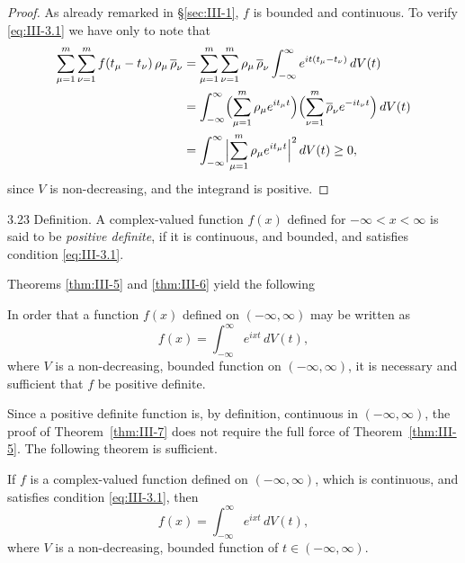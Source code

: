 \begin{proof}
As already remarked in \S\ref{sec:III-1}, $f$ is bounded and continuous. To verify \eqref{eq:III-3.1} we have only to note that
\begin{align*}
\sum_{\mu=1}^{m}\sum_{\nu=1}^{m}f(t_{\mu}-t_{\nu})\,\rho_{\mu}\,\overline{\rho}_{\nu}
&=\sum_{\mu=1}^{m}\sum_{\nu=1}^{m}\rho_{\mu}\,\overline{\rho}_{\nu}
\int_{-\infty}^{\infty}e^{it(t_{\mu}-t_{\nu})}\,dV(t)\\
&=\int_{-\infty}^{\infty}\Bigl(\sum_{\mu=1}^{m}\rho_{\mu}e^{it_{\mu}t}\Bigr)
\Bigl(\sum_{\nu=1}^{m}\overline{\rho}_{\nu}e^{-it_{\nu}t}\Bigr)\,dV(t)\\
&=\int_{-\infty}^{\infty}\Bigl|\sum_{\mu=1}^{m}\rho_{\mu}e^{it_{\mu}t}\Bigr|^{2}\,dV(t)\ge0,
\end{align*}
since $V$ is non-decreasing, and the integrand is positive.
\end{proof}

\begin{nstmt}{3.23}\label{eq:III-3.23}
Definition. A complex-valued function $f(x)$ defined for $-\infty<x<\infty$ is said to be \emph{positive definite}, if it is continuous, and bounded, and satisfies condition \eqref{eq:III-3.1}.
\end{nstmt}

Theorems \ref{thm:III-5} and \ref{thm:III-6} yield the following

\begin{theorem}[Bochner]\label{thm:III-7}
In order that a function $f(x)$ defined on $(-\infty,\infty)$ may be written as
\[
f(x)=\int_{-\infty}^{\infty}e^{ixt}\,dV(t),
\]
where $V$ is a non-decreasing, bounded function on $(-\infty,\infty)$, it is necessary and sufficient that $f$ be positive definite.
\end{theorem}

Since a positive definite function is, by definition, continuous in $(-\infty,\infty)$, the proof of Theorem~\ref{thm:III-7} does not require the full force of Theorem~\ref{thm:III-5}. The following theorem is sufficient.

\begin{theorem}\label{thm:III-8}
If $f$ is a complex-valued function defined on $(-\infty,\infty)$, which is continuous, and satisfies condition \eqref{eq:III-3.1}, then
\begin{equation}\tag{3.24}\label{eq:III-3.24}
f(x)=\int_{-\infty}^{\infty}e^{ixt}\,dV(t),
\end{equation}
where $V$ is a non-decreasing, bounded function of $t\in(-\infty,\infty)$.
\end{theorem}

